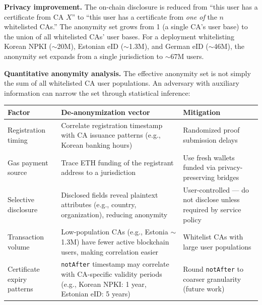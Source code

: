 \documentclass[11pt, a4paper]{article}
\begin{document}
\textbf{Privacy improvement.} The on-chain disclosure is reduced from
``this user has a certificate from CA \(X\)'' to ``this user has a
certificate from \emph{one of} the \(n\) whitelisted CAs.'' The
anonymity set grows from 1 (a single CA's user base) to the union of all
whitelisted CAs' user bases. For a deployment whitelisting Korean NPKI
($\sim$20M), Estonian eID ($\sim$1.3M), and German eID
($\sim$46M), the anonymity set expands from a single
jurisdiction to $\sim$67M users.

\textbf{Quantitative anonymity analysis.} The effective anonymity set is
not simply the sum of all whitelisted CA user populations. An adversary
with auxiliary information can narrow the set through statistical
inference:

\begin{longtable}[]{@{}
  >{\raggedright\arraybackslash}p{}
  >{\raggedright\arraybackslash}p{}
  >{\raggedright\arraybackslash}p{}@{}}
\toprule\noalign{}
\begin{minipage}[b]{\linewidth}\raggedright
Factor
\end{minipage} & \begin{minipage}[b]{\linewidth}\raggedright
De-anonymization vector
\end{minipage} & \begin{minipage}[b]{\linewidth}\raggedright
Mitigation
\end{minipage} \\
\midrule\noalign{}
\endhead
\bottomrule\noalign{}
\endlastfoot
Registration timing & Correlate registration timestamp with CA issuance
patterns (e.g., Korean banking hours) & Randomized proof submission
delays \\
Gas payment source & Trace ETH funding of the registrant address to a
jurisdiction & Use fresh wallets funded via privacy-preserving
bridges \\
Selective disclosure & Disclosed fields reveal plaintext attributes
(e.g., country, organization), reducing anonymity &
User-controlled --- do not disclose unless required by service policy \\
Transaction volume & Low-population CAs (e.g., Estonia
$\sim$1.3M) have fewer active blockchain users, making
correlation easier & Whitelist CAs with large user populations \\
Certificate expiry patterns & \texttt{notAfter} timestamp may correlate
with CA-specific validity periods (e.g., Korean NPKI: 1 year, Estonian
eID: 5 years) & Round \texttt{notAfter} to coarser granularity (future
work) \\
\end{longtable}
\end{document}
